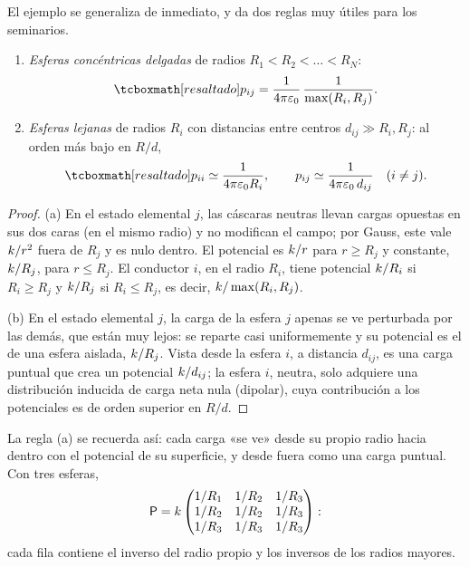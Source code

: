 

El ejemplo se generaliza de inmediato, y da dos reglas muy útiles para los seminarios.

\begin{proposicion}\label{prop:reglas}
\begin{enumerate}[label=\textup{(\alph*)}]
  \item \emph{Esferas concéntricas delgadas} de radios $R_1<R_2<\dots<R_N$:
        \begin{equation}\label{eq:regla-concentricas}
          \resalta{p_{ij}=\frac{1}{4\pi\eo}\,\frac{1}{\max(R_i,R_j)} .}
        \end{equation}
  \item \emph{Esferas lejanas} de radios $R_i$ con distancias entre centros $d_{ij}\gg R_i,R_j$: al orden más bajo en $R/d$,
        \begin{equation}\label{eq:regla-lejanas}
          \resalta{p_{ii}\simeq\frac{1}{4\pi\eo R_i},\qquad p_{ij}\simeq\frac{1}{4\pi\eo\,d_{ij}}\quad(i\neq j).}
        \end{equation}
\end{enumerate}
\end{proposicion}
\begin{proof}
(a) En el estado elemental $j$, las cáscaras neutras llevan cargas opuestas en sus dos caras (en el mismo radio) y no modifican el campo; por Gauss,
este vale $k/r^{2}$ fuera de $R_j$ y es nulo dentro. El potencial es $k/r$ para $r\ge R_j$ y constante, $k/R_j$, para $r\le R_j$. El conductor $i$,
en el radio $R_i$, tiene potencial $k/R_i$ si $R_i\ge R_j$ y $k/R_j$ si $R_i\le R_j$, es decir, $k/\max(R_i,R_j)$.

(b) En el estado elemental $j$, la carga de la esfera $j$ apenas se ve perturbada por las demás, que están muy lejos: se reparte casi uniformemente y
su potencial es el de una esfera aislada, $k/R_j$. Vista desde la esfera $i$, a distancia $d_{ij}$, es una carga puntual que crea un potencial
$k/d_{ij}$; la esfera $i$, neutra, solo adquiere una distribución inducida de carga neta nula (dipolar), cuya contribución a los potenciales es de
orden superior en $R/d$.
\end{proof}

La regla (a) se recuerda así: cada carga «se ve» desde su propio radio hacia dentro con el potencial de su superficie, y desde fuera como una
carga puntual. Con tres esferas,
\[
  \mathsf{P}=k\begin{pmatrix}1/R_1 & 1/R_2 & 1/R_3\\ 1/R_2 & 1/R_2 & 1/R_3\\ 1/R_3 & 1/R_3 & 1/R_3\end{pmatrix}:
\]
cada fila contiene el inverso del radio propio y los inversos de los radios mayores.

